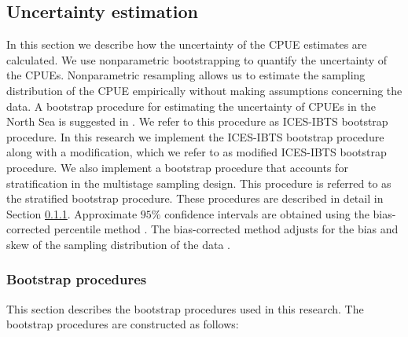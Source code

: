 \documentclass[a4paper 12pt]{article}
\numberwithin{equation}{section}
\newcommand{\ed}[1]{\textcolor{red}{#1}}
\begin{document}
\subsection{Uncertainty estimation}
\label{sec:uncertaintyestimation}
In this section we describe how the uncertainty of the CPUE estimates are calculated. We use nonparametric bootstrapping to quantify the uncertainty of the CPUEs. Nonparametric resampling allows us to estimate the sampling distribution of the CPUE empirically without making assumptions concerning the data. A bootstrap procedure for estimating the uncertainty of CPUEs in the North Sea is suggested in \citet{ICES2006Report}. We refer to this procedure as ICES-IBTS bootstrap procedure. In this research we implement the ICES-IBTS bootstrap procedure along with a modification, which we refer to as modified ICES-IBTS bootstrap procedure. We also implement a bootstrap procedure that accounts for stratification in the multistage sampling design. This procedure is referred to as the stratified bootstrap procedure. These procedures are described in detail in Section \ref{sec:datrasstratifiedbootstrap}. Approximate $95\%$ confidence intervals are obtained using the bias-corrected percentile method  \citep{carpenter2000bootstrap}. The bias-corrected method adjusts for the bias and skew of the sampling distribution of the data \citep{puth2015variety, karlsson2009bootstrap}. 

\subsubsection{Bootstrap procedures}
\label{sec:datrasstratifiedbootstrap}
This section describes the bootstrap procedures used in this research. The bootstrap procedures are constructed as follows:

\end{document}
